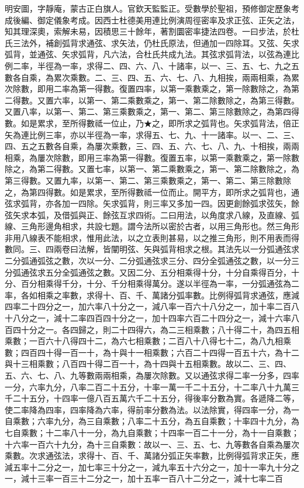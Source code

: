 \begin{pinyinscope}
明安圖，字靜庵，蒙古正白旗人。官欽天監監正。受數學於聖祖，預修御定歷象考成後編、御定儀象考成。因西士杜德美用連比例演周徑密率及求正弦、正矢之法，知其理深奧，索解未易，因積思三十餘年，著割圜密率捷法四卷。一曰步法，於杜氏三法外，補創弧背求通弦、求矢法，仍杜氏原法，但通加一四除耳。又弦、矢求弧背，並通弦、矢求弧背，凡六法，合杜氏共成九法。其弦求弧背法，以弦為連比例二率，半徑為一率，求得二、四、六、八、十諸率，以一、三、五、七、九之五數各自乘，為累次乘數。二、三、四、五、六、七、八、九相挨，兩兩相乘，為累次除數，即用二率為第一得數。復置四率，以第一乘數乘之，第一除數除之，為第二得數。又置六率，以第一、第二乘數乘之，第一、第二除數除之，為第三得數。又置八率，以第一、第二、第三乘數乘之，第一、第二、第三除數除之，為第四得數。如是累求，至所得數祗一位止，乃★之，即所求之弧背也。矢求弧背法，倍正矢為連比例三率，亦以半徑為一率，求得五、七、九、十一諸率。以一、二、三、四、五之五數各自乘，為屢次乘數，三、四、五、六、七、八、九、十相挨，兩兩相乘，為屢次除數，即用三率為第一得數。復置五率，以第一乘數乘之，第一除數除之，為第二得數。又置七率，以第一、第二乘數乘之，第一、第二除數除之，為第三得數。又置九率，以第一、第二、第三乘數乘之，第一、第二、第三除數除之，為第四得數。如是累求，至所得數祗一位而止。開平方，即所求之弧背也，通弦求弧背，亦各加一四除。矢求弧背，則三率又多加一四。因更創餘弧求弦矢，餘弦矢求本弧，及借弧與正、餘弦互求四術。二曰用法，以角度求八線，及直線、弧線、三角形邊角相求，共設七題。謂今法所以密於古者，以用三角形也。然三角形非用八線表不能相求，惟用此法，以之立表則甚易，以之推三角形，則不用表而得數同。三、四兩卷曰法解，皆闡明弦、矢與弧背相求之根。其法先以一分弧通弦求二分弧通弧弦之數，次以一分、二分弧通弦求三分、四分全弧通弦之數，以一分三分弧通弦求五分全弧通弦之數。又因二分、五分相乘得十分，十分自乘得百分，十分、百分相乘得千分，十分、千分相乘得萬分。遂以半徑為一率，一分弧通弦為二率，各如相乘之率數，求得十、百、千、萬諸分弧率數。比例得弧背求通弦，應減四率二十四分之一，加六率八十分之一，減八率一百六十八分之一，加十率二百八十八分之一，減十二率四百四十分之一，加十四率六百二十四分之一，減十六率八百四十分之一。各四歸之，則二十四得六，為二三相乘數；八十得二十，為四五相乘數；一百六十八得四十二，為六七相乘數；二百八十八得七十二，為八九相乘數；四百四十得一百一十，為十與十一相乘數；六百二十四得一百五十六，為十二與十三相乘數；八百四十得二百一十，為十四與十五相乘數。故以二、三、四、五、六、七、八、九等數兩兩相乘，為屢次除數。又以通弦求得二率一分多，四率一分，六率九分，八率二百二十五分，十率一萬一千二十五分，十二率八十九萬三千二十五分，十四率一億八百五萬六千二十五分，得後率分數為實。各遞降二等，使二率降為四率，四率降為六率，得前率分數為法。以法除實，得四率一分，為一自乘數；六率九分，為三自乘數；八率二十五分，為五自乘數；十率四十九分，為七自乘數；十二率八十一分，為九自乘數；十四率一百二十一分，為十一自乘數；十六率一百六十九分，為十三自乘數：故以一、三、五、七、九等數各自乘為屢次乘數。次求通弦法，求得十、百、千、萬諸分弧正矢率數，比例得弧背求正矢，應減五率十二分之一，加七率三十分之一，減九率五十六分之一，加十一率九十分之一，減十三率一百三十二分之一，加十五率一百八十二分之一，減十七率二百
\end{pinyinscope}
